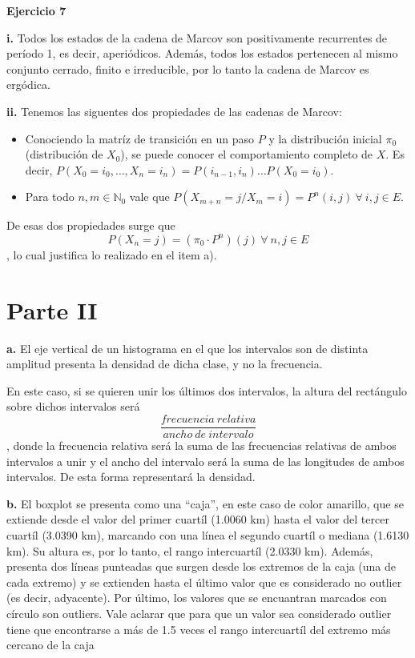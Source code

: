\documentclass[11pt]{article}
\begin{document}
\textbf{Ejercicio 7}

\textbf{i.}
Todos los estados de la cadena de Marcov son positivamente recurrentes de período 1, es decir, aperiódicos. Además, todos los estados pertenecen al mismo conjunto cerrado, finito e irreducible, por lo tanto la cadena de Marcov es ergódica.

\textbf{ii.}
Tenemos las siguentes dos propiedades de las cadenas de Marcov:

\begin{itemize}
    \item Conociendo la matríz de transición en un paso $P$ y la distribución inicial $\pi_0$ (distribución de $X_0$), se puede conocer el comportamiento completo de $X$. Es decir, $P(X_0 = i_0, \dots, X_n = i_n) = P(i_{n-1}, i_n) \dots P(X_0 = i_0)$.
    \item Para todo $n,m \in \mathbb{N}_0$ vale que $P(X_{m+n} = j / X_m = i) = P^n(i,j) \ \forall\ i,j \in E$.
\end{itemize}

De esas dos propiedades surge que $$P(X_n = j) = (\pi_0 \cdot P^n)(j)\ \forall\ n,j \in E$$, lo cual justifica lo realizado en el item a).

\section*{Parte II}

\textbf{a.}
El eje vertical de un histograma en el que los intervalos son de distinta amplitud presenta la densidad de dicha clase, y no la frecuencia.

En este caso, si se quieren unir los últimos dos intervalos, la altura del rectángulo sobre dichos intervalos será $$\frac{frecuencia\ relativa}{ancho\ de\ intervalo}$$, donde la frecuencia relativa será la suma de las frecuencias relativas de ambos intervalos a unir y el ancho del intervalo será la suma de las longitudes de ambos intervalos. De esta forma representará la densidad.

\textbf{b.}
El boxplot se presenta como una ``caja'', en este caso de color amarillo, que se extiende desde el valor del primer cuartíl (1.0060 km) hasta el valor del tercer cuartíl (3.0390 km), marcando con una línea el segundo cuartíl o mediana (1.6130 km). Su altura es, por lo tanto, el rango intercuartíl (2.0330 km). Además, presenta dos líneas punteadas que surgen desde los extremos de la caja (una de cada extremo) y se extienden hasta el último valor que es considerado no outlier (es decir, adyacente). Por último, los valores que se encuantran marcados con círculo son outliers. 
Vale aclarar que para que un valor sea considerado outlier tiene que encontrarse a más de 1.5 veces el rango intercuartíl del extremo más cercano de la caja
\end{document}
